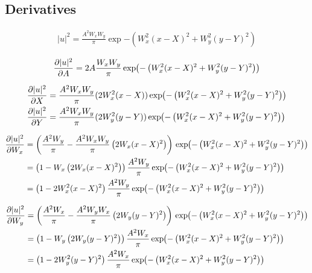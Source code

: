 \subsection{Derivatives}

\begin{equation}
\begin{split}
|u|^2 = \frac{A^2W_x W_y}{\pi} \exp{-\left( W_x^2(x-X)^2 + W_y^2(y-Y)^2 \right)}
\end{split}
\end{equation}

\begin{equation}
\begin{split}
\pder{|u|^2}{A}  = 2A \frac{W_x W_y}{\pi} \exp{-\left( W_x^2(x-X)^2 + W_y^2(y-Y)^2 \right)}
\end{split}
\end{equation}

\begin{equation}
\begin{split}
\pder{|u|^2}{X}  &= \frac{A^2W_x W_y}{\pi} (2W_x^2(x-X)) \exp{-\left( W_x^2(x-X)^2 + W_y^2(y-Y)^2 
\right)}\\
\pder{|u|^2}{Y}  &= \frac{A^2W_x W_y}{\pi} (2W_y^2(y-Y)) \exp{-\left( W_x^2(x-X)^2 + W_y^2(y-Y)^2 \right)}
\end{split}
\end{equation}





\begin{equation}
\begin{split}
\pder{|u|^2}{W_{x}} &= \left( \frac{A^2 W_y}{\pi} - \frac{A^2 W_{x} W_y}{\pi} \left(2W_x(x-X)^2\right)  \right)\exp{-\left( W_x^2(x-X)^2 + W_y^2(y-Y)^2 \right)}\\
&= \left( 1 - W_{x} \left(2W_x(x-X)^2\right)  \right) \frac{A^2 W_y}{\pi} \exp{-\left( W_x^2(x-X)^2 + W_y^2(y-Y)^2 \right)}\\
&= \left(1  - 2 W_{x}^2 (x-X)^2  \right) \frac{A^2 W_y}{\pi}\exp{-\left( W_x^2(x-X)^2 + W_y^2(y-Y)^2 \right)}\\
\end{split}
\end{equation}


\begin{equation}
\begin{split}
\pder{|u|^2}{W_{y}} &= \left( \frac{A^2 W_x}{\pi} - \frac{A^2 W_{y} W_x}{\pi} \left(2W_y(y-Y)^2\right) \right)\exp{-\left( W_x^2(x-X)^2 + W_y^2(y-Y)^2 \right)}\\
&= \left( 1 - W_{y} \left(2W_y(y-Y)^2\right)  \right) \frac{A^2 W_x}{\pi} \exp{-\left( W_x^2(x-X)^2 + W_y^2(y-Y)^2 \right)}\\
&= \left(1  - 2 W_{y}^2 (y-Y)^2  \right) \frac{A^2 W_x}{\pi}\exp{-\left( W_x^2(x-X)^2 + W_y^2(y-Y)^2 \right)}\\
\end{split}
\end{equation}

